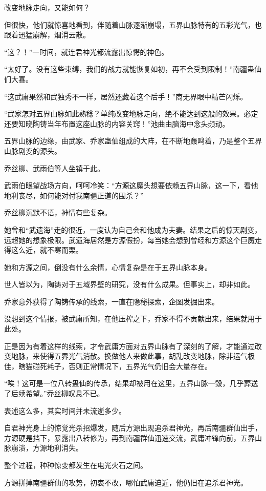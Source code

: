 \begin{this_body}
改变地脉走向，又能如何？

但很快，他们就惊喜地看到，伴随着山脉逐渐崩塌，五界山脉特有的五彩光气，也跟着迅猛崩解，烟消云散。

“这？！”一时间，就连君神光都流露出惊愕的神色。

“太好了。没有这些束缚，我们的战力就能恢复如初，再不会受到限制！”南疆蛊仙们大喜。

“这武庸果然和武独秀不一样，居然还藏着这个后手！”商无界眼中精芒闪烁。

“武家怎对五界山脉如此熟稔？单纯改变地脉走向，绝不能达到这般的效果。必定还要知晓陶铸当年布置这座山脉的内容关窍！”池曲由脑海中念头频动。

五界山脉的边缘，由武家、乔家蛊仙组成的大阵，在不断地轰鸣着，乃是整个五界山脉剧变的源头。

乔丝柳、武雨伯等人坐镇于此。

武雨伯眼望战场方向，呵呵冷笑：“方源这魔头想要依赖五界山脉，这一下，看他地利丧尽，如何能对付我南疆正道的围杀？”

乔丝柳沉默不语，神情有些复杂。

她曾和“武遗海”走的很近，一度认为自己会和他成为夫妻。结果之后的惊天剧变，远超她的想象极限。武遗海居然是方源假扮，每当她会想到曾经和方源这个巨魔走得这么近，就不寒而栗。

她和方源之间，倒没有什么余情，心情复杂是在于五界山脉本身。

世人皆以为，陶铸对于五域界壁的研究，没有什么成果。但事实上，却非如此。

乔家意外获得了陶铸传承的线索，一直在隐秘探索，企图发掘出来。

没想到这个情报，被武庸所知，在他压榨之下，乔家不得不贡献出来，结果就用于此处。

正是因为有着这样的线索，才令武庸方面对五界山脉有了深刻的了解，才能通过改变地脉，来使得五界光气消散。换做他人来做此事，胡乱改变地脉，除非运气极佳，瞎猫碰死耗子，否则正常情况下，五界光气仍旧会大量存在。

“唉！这可是一位八转蛊仙的传承，结果却被用在这里，五界山脉一毁，几乎葬送了后续希望。”乔丝柳叹息不已。

表述这么多，其实时间并未流逝多少。

自君神光身上的惊觉光杀招爆发，随后方源出现追杀君神光，再后南疆群仙出手，方源硬是挡下，暴露出八转修为，再到南疆群仙迅速交流，武庸冲锋向前，五界山脉崩溃，方源地利消失。

整个过程，种种惊变都发生在电光火石之间。

方源拼掉南疆群仙的攻势，初衷不改，哪怕武庸迫近，他仍旧在追杀君神光。


\end{this_body}
